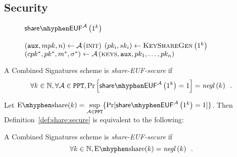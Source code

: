   \subsection{Security}
    \begin{figure}[H]
      \begin{gamebox}{$\mathsf{share \mhyphen
      EUF}^{\adversary}\left(1^k\right)$}
        \begin{algorithmic}[1]
          \State $\left(\mathtt{aux}, mpk, n\right) \gets
          \mathcal{A}\left(\textsc{init}\right)$
            \State $\left(pk_i, sk_i\right) \gets
            \textsc{KeyShareGen}\left(1^k\right)$
          \EndFor
          \State $\left(cpk^*, pk^*, m^*, \sigma^*\right) \gets
          \mathcal{A}\left(\textsc{keys}, \mathtt{aux}, pk_1, \dots, pk_n\right)$
            \State {}
          \Else
            \State {}
          \EndIf
        \end{algorithmic}
      \end{gamebox}
      \caption{}
      \label{game:comb:share}
    \end{figure}
    \begin{definition}
      \label{def:share:secure}
      A Combined Signatures scheme is \emph{\textsf{share-EUF}-secure} if
      \begin{equation*}
        \forall k \in \mathbb{N}, \forall \adversary \in \mathtt{PPT},
        \Pr\left[\mathsf{share \mhyphen EUF}^{\adversary}\left(1^k\right) =
        1\right] = \mathit{negl}\left(k\right) \enspace.
      \end{equation*}
    \end{definition}

    Let $\mathrm{E \mhyphen share}(k) = \underset{\adversary \in
    \mathtt{PPT}}{\sup}\{\Pr[\mathsf{share \mhyphen
    EUF}^{\adversary}\left(1^k\right) = 1]\}$. Then
    Definition~\ref{def:share:secure} is equivalent to the following:

    \begin{definition}
      \label{def:share:secure:sup}
      A Combined Signatures scheme is \emph{\textsf{share-EUF}-secure} if
      \begin{equation*}
        \forall k \in \mathbb{N}, \mathrm{E \mhyphen share}(k) =
        \mathit{negl}\left(k\right) \enspace.
      \end{equation*}
    \end{definition}

